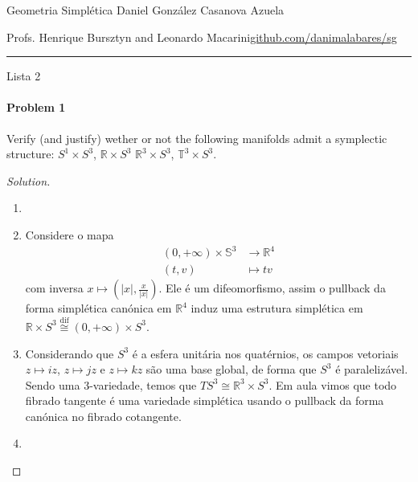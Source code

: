 

\usepackage[style=authortitle-terse,backend=bibtex]{biblatex}




\begin{minipage}{\textwidth}
	\begin{minipage}{1\textwidth}
		Geometria Simpl\'etica \hfill Daniel González Casanova Azuela
		
		{\small Profs. Henrique Bursztyn and Leonardo Macarini\hfill\href{https://github.com/danimalabares/sg}{github.com/danimalabares/sg}}
	\end{minipage}
\end{minipage}\vspace{.2cm}\hrule

\vspace{10pt}
{\huge Lista 2}

\paragraph{Problem 1} Verify (and justify) wether or not the following manifolds admit a symplectic structure: $S^{1}\times S^3$, $\mathbb{R}\times S^3$ $\mathbb{R}^{3}\times S^{3}$, $\mathbb{T}^3\times S^3$.

\begin{proof}[Solution]\leavevmode
	\begin{enumerate}[label=\alph*.]
		\item 

		\item Considere o mapa
			\begin{align*}
				(0,+\infty)\times \mathbb{S}^3 &\longrightarrow \mathbb{R}^4 \\
				(t,v) &\longmapsto tv
			\end{align*}
			com inversa $x\mapsto \left( |x|,\frac{x}{|x|} \right)$. Ele \'e um difeomorfismo, assim o pullback da forma simpl\'etica can\'onica em $\mathbb{R}^{4}$ induz uma estrutura simpl\'etica em $\mathbb{R}\times S^3\overset{\operatorname{dif}}{\cong} (0,+\infty)\times S^3$.

		\item Considerando que $S^3$ \'e a esfera unit\'aria nos quat\'ernios, os campos vetoriais $z\mapsto iz$, $z\mapsto jz$ e $z\mapsto kz$ s\~ao uma base global, de forma que $S^3$ \'e paraleliz\'avel. Sendo uma 3-variedade, temos que $TS^3\cong \mathbb{R}^{3}\times S^3$. Em aula vimos que todo fibrado tangente \'e uma variedade simpl\'etica usando o pullback da forma can\'onica no fibrado cotangente.

		\item 
	\end{enumerate}
\end{proof}

